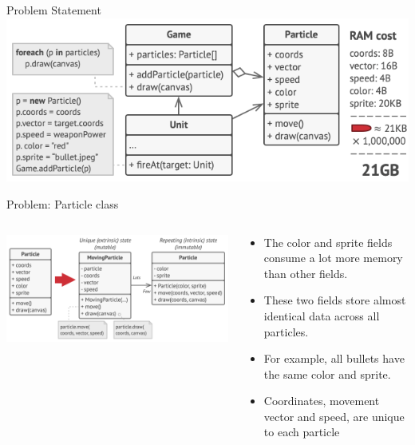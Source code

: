 \documentclass[13pt]{beamer}
\begin{document}
\begin{frame}{Problem Statement}
	\includegraphics[scale=0.5]{./images/problem1.png}
\end{frame}

\begin{frame}{Problem: Particle class}
	\begin{columns}[T]
		\begin{column}{.5\textwidth}
			\includegraphics[scale=0.27]{./images/class2.png}
		\end{column}
	
		\begin{column}{.5\textwidth}
			\begin{itemize}
				\item The color and sprite fields consume a lot more memory than other fields.
				\item These two fields store almost identical data across all particles.
				\item For example, all bullets have the same color and sprite.
				\item Coordinates, movement vector and speed, are unique to each particle
			\end{itemize}
		\end{column}
	\end{columns}
\end{frame}
\end{document}
